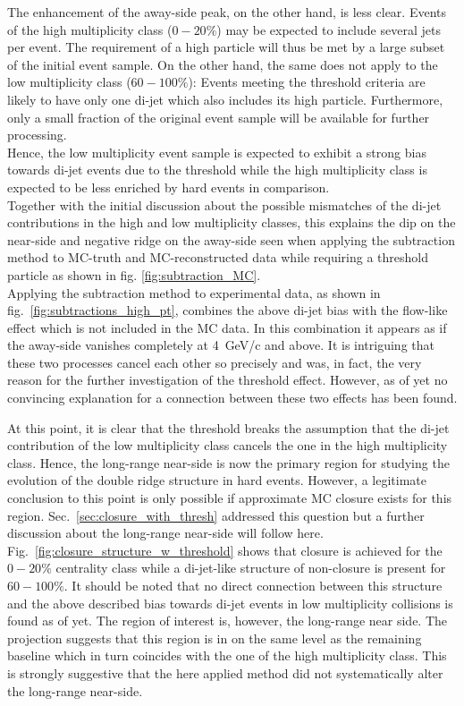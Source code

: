 The enhancement of the away-side peak, on the other hand, is less clear. Events of the high multiplicity class ($0-20\%$) may be expected to include several jets per event. The requirement of a high \pt particle will thus be met by a large subset of the initial event sample. On the other hand, the same does not apply to the low multiplicity class ($60-100\%$): Events meeting the threshold criteria are likely to have only one di-jet which also includes its high \pt particle. Furthermore, only a small fraction of the original event sample will be available for further processing.\\
Hence, the low multiplicity event sample is expected to exhibit a strong bias towards di-jet events due to the threshold while the high multiplicity class is expected to be less enriched by hard events in comparison.\\

Together with the initial discussion about the possible mismatches of the di-jet contributions in the high and low multiplicity classes, this explains the dip on the near-side and negative ridge on the away-side seen when applying the subtraction method to MC-truth and MC-reconstructed data while requiring a threshold particle as shown in fig. \ref{fig:subtraction_MC}.\\

Applying the subtraction method to experimental data, as shown in fig.~\ref{fig:subtractions_high_pt}, combines the above di-jet bias with the flow-like effect which is not included in the MC data. In this combination it appears as if the away-side vanishes completely at \SI{4}{GeV/c} and above. It is intriguing that these two processes cancel each other so precisely and was, in fact, the very reason for the further investigation of the threshold effect. However, as of yet no convincing explanation for a connection between these two effects has been found.

At this point, it is clear that the threshold breaks the assumption that the di-jet contribution of the low multiplicity class cancels the one in the high multiplicity class. Hence, the long-range near-side is now the primary region for studying the evolution of the double ridge structure in hard events. However, a legitimate conclusion to this point is only possible if approximate MC closure exists for this region. Sec.~\ref{sec:closure_with_thresh} addressed this question but a further discussion about the long-range near-side will follow here. Fig.~\ref{fig:closure_structure_w_threshold} shows that closure is achieved for the $0-20\%$ centrality class while a di-jet-like structure of non-closure is present for $60-100\%$. It should be noted that no direct connection between this structure and the above described bias towards di-jet events in low multiplicity collisions is found as of yet. The region of interest is, however, the long-range near side. The \deta projection suggests that this region is in on the same level as the remaining baseline which in turn coincides with the one of the high multiplicity class. This is strongly suggestive that the here applied method did not systematically alter the long-range near-side.\\

